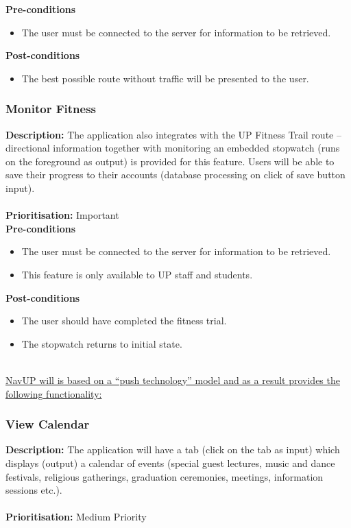 \documentclass[runningheads,a4paper]{article}
\begin{document}
  
\textbf{Pre-conditions}
\begin{itemize}
	\item The user must be connected to the server for information to be retrieved.
\end{itemize}
  
\textbf{Post-conditions}
\begin{itemize}
  	\item The best possible route without traffic will be presented to the user.
\end{itemize}

\subsubsection{Monitor Fitness}

\textbf{Description:} The application also integrates with the UP Fitness Trail route – directional information together with monitoring an embedded stopwatch (runs on the foreground as output) is provided for this feature. Users will be able to save their progress to their accounts (database processing on click of save button input).\\\\
\noindent
\textbf{Prioritisation:} Important\\
  
  
\textbf{Pre-conditions}
\begin{itemize}
	\item The user must be connected to the server for information to be retrieved.
	\item This feature is only available to UP staff and students.
\end{itemize}
  
\textbf{Post-conditions}
\begin{itemize}
  	\item The user should have completed the fitness trial.
	\item The stopwatch returns to initial state.
\end{itemize}

\noindent \\ \underline{NavUP will is based on a “push technology” model and as a result provides the following functionality:}

\subsubsection{View Calendar}

\textbf{Description:} The application will have a tab (click on the tab as input) which displays (output) a calendar of events (special guest lectures, music and dance festivals, religious gatherings, graduation ceremonies, meetings, information sessions etc.).\\\\
\noindent
\textbf{Prioritisation:} Medium Priority\\
  
\end{document}
